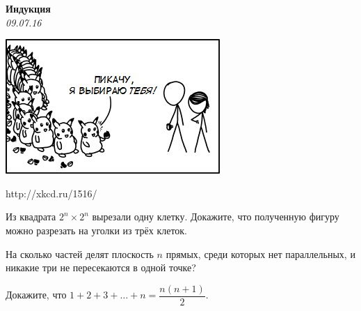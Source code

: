 \begin{center}
\textbf{\Large Индукция}\\
\textit{09.07.16}
\end{center}

\epigraph{\includegraphics[width=.8\textwidth]{ind.jpg}}{http://xkcd.ru/1516/}

\begin{problems}
\item Из квадрата $2^n \times 2^n$ вырезали одну клетку. Докажите,
что полученную фигуру можно разрезать на уголки из трёх клеток.

\item
На сколько частей делят плоскость $n$ прямых, среди которых нет
параллельных, и никакие три не пересекаются в одной точке?

\item
Докажите, что $1 + 2 + 3 + \ldots + n = \dfrac{n(n+1)}{2}$.

\end{problems}

\resetproblem





